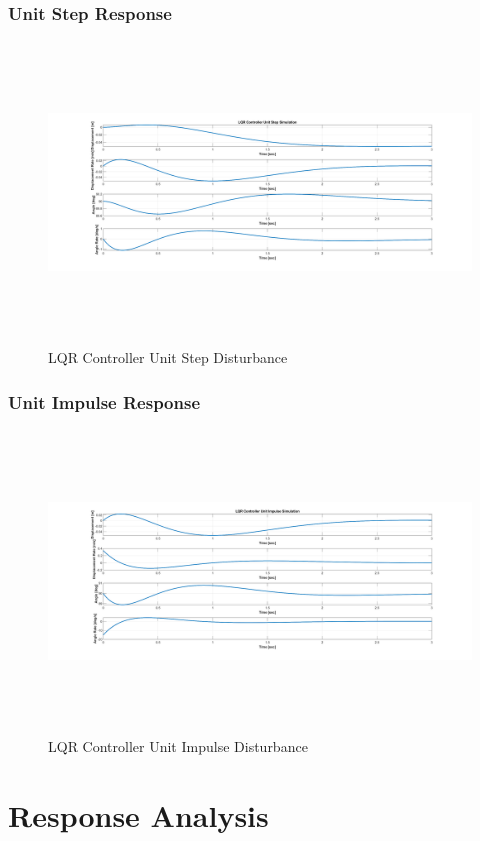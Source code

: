 \documentclass[titlepage]{article}
\begin{document}
\subsubsection{Unit Step Response}

\begin{figure}[H]
\center
\includegraphics[width=16cm, height=8cm]{lqr_unit_step.png}
\caption{LQR Controller Unit Step Disturbance}
\end{figure}

\subsubsection{Unit Impulse Response}

\begin{figure}[H]
\center
\includegraphics[width=16cm, height=8cm]{lqr_unit_impulse.png}
\caption{LQR Controller Unit Impulse Disturbance}
\end{figure}

\newpage
\section{Response Analysis}
\end{document}
